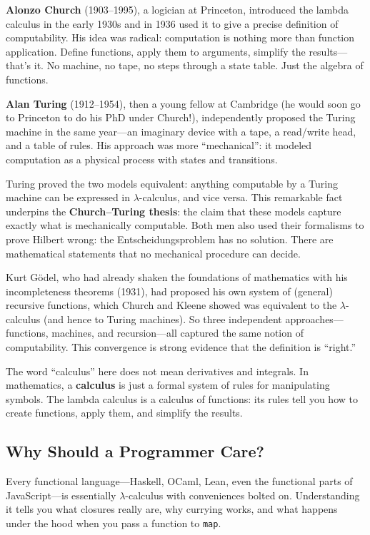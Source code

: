 \documentclass[11pt,a4paper]{article}
\theoremstyle{definition}
\newcommand{\lam}{\lambda}
\begin{document}
\textbf{Alonzo Church} (1903--1995), a logician at Princeton, introduced
the lambda calculus in the early 1930s and in 1936 used it to give a precise
definition of computability. His idea was radical: computation is nothing more
than function application. Define functions, apply them to arguments, simplify
the results---that's it. No machine, no tape, no steps through a state
table. Just the algebra of functions.

\textbf{Alan Turing} (1912--1954), then a young fellow at Cambridge (he
would soon go to Princeton to do his PhD under Church!), independently proposed
the Turing machine in the same year---an imaginary device with a tape, a read/write head, and a table
of rules. His approach was more ``mechanical'': it modeled computation as a
physical process with states and transitions.

Turing proved the two models equivalent: anything computable by a
Turing machine can be expressed in $\lam$-calculus, and vice versa. This
remarkable fact underpins the \textbf{Church--Turing thesis}: the claim that
these models capture exactly what is mechanically computable. Both men also used
their formalisms to prove Hilbert wrong: the Entscheidungsproblem has no
solution. There are mathematical statements that no mechanical procedure can
decide.

Kurt G\"odel, who had already shaken the foundations of mathematics with his
incompleteness theorems (1931), had proposed his own system of (general)
recursive functions, which Church and Kleene showed was equivalent to the
$\lam$-calculus (and hence to Turing machines). So three independent approaches---functions, machines,
and recursion---all captured the same notion of computability. This convergence
is strong evidence that the definition is ``right.''

The word ``calculus'' here does not mean derivatives and integrals. In
mathematics, a \textbf{calculus} is just a formal system of rules for
manipulating symbols. The lambda calculus is a calculus of functions: its rules
tell you how to create functions, apply them, and simplify the results.

\subsection{Why Should a Programmer Care?}

Every functional language---Haskell, OCaml, Lean, even
the functional parts of JavaScript---is essentially $\lam$-calculus with
conveniences bolted on. Understanding it tells you what closures really are,
why currying works, and what happens under the hood when you pass a function
to \texttt{map}.
\end{document}
